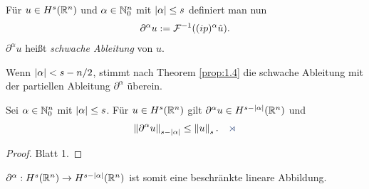 \begin{defn*}
Für $u\in H^s(\mathbb{R}^n)$ und $\alpha\in\mathbb{N}_0^n$ mit $\left|\alpha\right| \le s$ definiert
man nun
\begin{align*}
\partial^\alpha u:= \mathcal{F}^{-1}((ip)^\alpha \hat{u}).
\end{align*}
$\partial^\alpha u$ heißt \emph{schwache Ableitung} von $u$.\fishhere
\end{defn*}

Wenn $\left|\alpha\right| < s-n/2$, stimmt nach Theorem \ref{prop:1.4} die schwache
Ableitung mit der partiellen Ableitung  $\partial^\alpha$ überein.

\begin{lem}
\label{prop:1.7}
Sei $\alpha\in\mathbb{N}_0^n$ mit $\left|\alpha\right|\le s$. Für $u\in H^s(\mathbb{R}^n)$ gilt
$\partial^\alpha u \in H^{s-\left|\alpha\right|}(\mathbb{R}^n)$ und
\begin{align*}
\norm{\partial^\alpha u}_{s-\abs{\alpha}} \le \norm{u}_s.\fishhere
\end{align*}
\end{lem}
\begin{proof}
Blatt 1.\qedhere
\end{proof}

$\partial^\alpha : H^s(\mathbb{R}^n)\to H^{s-\left|\alpha\right|}(\mathbb{R}^n)$ ist somit eine
beschränkte lineare Abbildung.

